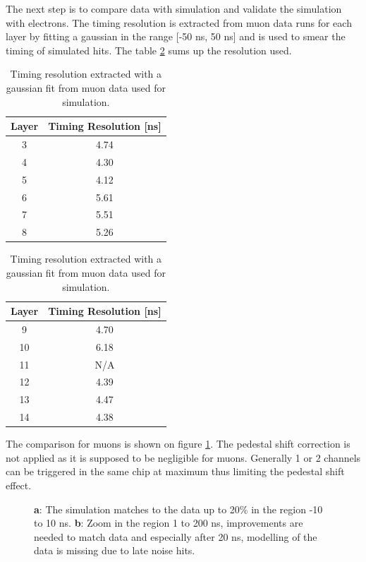 \documentclass[twoside,a4paper,11pt]{article}
\begin{document}
The next step is to compare data with simulation and validate the simulation with electrons. The timing resolution is extracted from muon data runs for each layer by fitting a gaussian in the range [-50 ns, 50 ns] and is used to smear the timing of simulated hits. The table \ref{table:time_res_sim} sums up the resolution used.
\begin{table}[htbp]
\centering
  \begin{tabular}{@{} cc @{}}
    \hline
    Layer & Timing Resolution [ns] \\ 
    \hline
     3 & 4.74 \\ 
     4 & 4.30 \\
     5 & 4.12 \\
	 6 & 5.61 \\
	 7 & 5.51 \\
	 8 & 5.26 \\
    \hline
  \end{tabular}
  \hspace{2ex}
  \begin{tabular}{@{} cc @{}}
    \hline
    Layer & Timing Resolution [ns] \\ 
    \hline
	 9 & 4.70 \\
	 10 & 6.18 \\
	 11 & N/A \footnotemark[1] \\
	 12 & 4.39 \\
	 13 & 4.47 \\
	 14 & 4.38 \\
	\hline
  \end{tabular}
  \caption{Timing resolution extracted with a gaussian fit from muon data used for simulation.}
  \label{table:time_res_sim}
\end{table}
The comparison for muons is shown on figure \ref{fig:sim_data_muon}. The pedestal shift correction is not applied as it is supposed to be negligible for muons. Generally 1 or 2 channels can be triggered in the same chip at maximum thus limiting the pedestal shift effect. 
\begin{figure}[htbp]
	\caption[]{\textbf{a}: The simulation matches to the data up to 20\% in the region -10 to 10 ns. \textbf{b}: Zoom in the region 1 to 200 ns, improvements are needed to match data and especially after 20 ns, modelling of the data is missing due to late noise hits.}
	\label{fig:sim_data_muon}
\end{figure}
\end{document}
